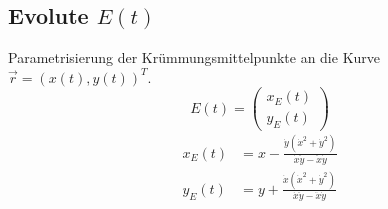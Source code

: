 \subsection{Evolute \hfill $E(t)$}
    Parametrisierung der Krümmungsmittelpunkte an die Kurve $\vec{r} = (x(t), y(t))^T$.
    $$
        E(t) = 
        \begin{pmatrix}
            x_E(t)\\y_E(t)
        \end{pmatrix}
    $$
    \begin{align*}
        x_E(t) &= x - \frac{\dot{y} \left( \dot{x}^2 + \dot{y}^2 \right)}{\dot{x} \ddot{y} - \ddot{x} \dot{y}}\\[0.25em]
        y_E(t) &= y + \frac{\dot{x} \left( \dot{x}^2 + \dot{y}^2 \right)}{\dot{x} \ddot{y} - \ddot{x} \dot{y}}
    \end{align*}